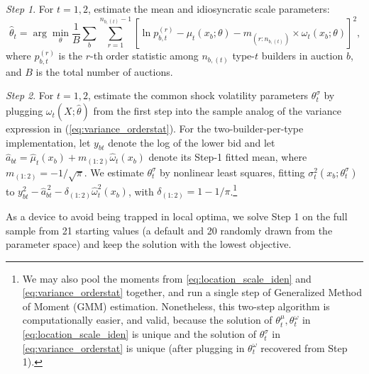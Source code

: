 \documentclass[12pt,reqno]{amsart}
\begin{document}
\noindent \textit{Step 1}. For $t=1,2$, estimate the mean and idiosyncratic scale parameters:
\[
\hat{\theta}_{t}=\arg \min_{\theta }\frac{1}{B}\sum_{b}%
\sum_{r=1}^{n_{b,(t)}-1}\left[ \ln p_{b,t}^{(r)}-\mu _{t}(x_{b};\theta
)-m_{(r:n_{b,(t)})}\times \omega _{t}(x_{b};\theta )\right] ^{2}\text{,} 
\]%
where $p_{b,t}^{(r)}$ is the $r$-th order statistic among $n_{b,(t)}$ type-$t$
builders in auction $b$, and $B$ is the total number of auctions.\textit{\medskip }

\noindent \textit{Step 2}. For $t=1,2$, estimate the common shock volatility parameters $\theta_t^\sigma$ by
plugging $\omega _{t}(X;\hat{\theta})$ from the first step into the sample
analog of the variance expression in (\ref{eq:variance_orderstat}). For the two-builder-per-type implementation, let $y_{bt}$ denote the log of the lower bid and let $\widehat a_{bt}=\widehat\mu_t(x_b)+m_{(1:2)}\widehat\omega_t(x_b)$ denote its Step-1 fitted mean, where $m_{(1:2)}=-1/\sqrt{\pi}$. We estimate $\theta_t^\sigma$ by nonlinear least squares, fitting $\sigma_t^2(x_b;\theta_t^\sigma)$ to $y_{bt}^2-\widehat a_{bt}^{\,2}-\delta_{(1:2)}\widehat\omega_t^2(x_b)$, with $\delta_{(1:2)}=1-1/\pi$.\footnote{We may also pool the moments from \eqref{eq:location_scale_iden} and \eqref{eq:variance_orderstat}     together, and run a single step of Generalized Method of Moment (GMM) estimation. Nonetheless, this two-step algorithm is computationally easier, and valid, because the solution of $\theta_t^\mu,\theta_t^\omega$ in \eqref{eq:location_scale_iden} is unique and the solution of $\theta_t^\sigma$ in \eqref{eq:variance_orderstat} is unique (after plugging in $\theta_t^\omega$ recovered from Step 1).}


\textit{\medskip }


As a device to avoid being trapped in local optima, we solve Step 1 on the full sample from 21 starting values (a default and 20 randomly drawn from the parameter space) and keep the solution with the lowest objective.
\end{document}
